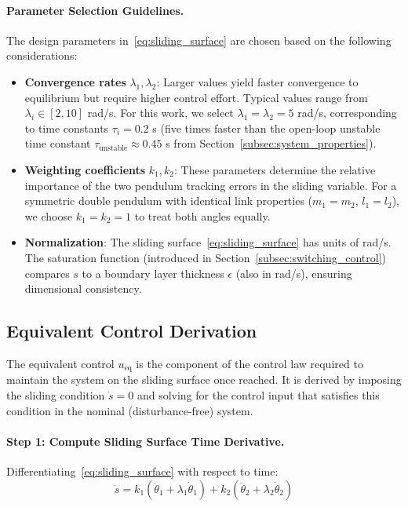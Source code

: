 \paragraph{Parameter Selection Guidelines.}
The design parameters in~\eqref{eq:sliding_surface} are chosen based on the following considerations:
\begin{itemize}
    \item \textbf{Convergence rates} $\lambda_1, \lambda_2$: Larger values yield faster convergence to equilibrium but require higher control effort. Typical values range from $\lambda_i \in [2, 10]$ rad/s. For this work, we select $\lambda_1 = \lambda_2 = 5$ rad/s, corresponding to time constants $\tau_i = 0.2$ s (five times faster than the open-loop unstable time constant $\tau_{\text{unstable}} \approx 0.45$ s from Section~\ref{subsec:system_properties}).

    \item \textbf{Weighting coefficients} $k_1, k_2$: These parameters determine the relative importance of the two pendulum tracking errors in the sliding variable. For a symmetric double pendulum with identical link properties ($m_1 = m_2$, $l_1 = l_2$), we choose $k_1 = k_2 = 1$ to treat both angles equally.

    \item \textbf{Normalization}: The sliding surface~\eqref{eq:sliding_surface} has units of rad/s. The saturation function (introduced in Section~\ref{subsec:switching_control}) compares $s$ to a boundary layer thickness $\epsilon$ (also in rad/s), ensuring dimensional consistency.
\end{itemize}

\subsection{Equivalent Control Derivation}
\label{subsec:equivalent_control}

The equivalent control $u_{\text{eq}}$ is the component of the control law required to maintain the system on the sliding surface once reached. It is derived by imposing the sliding condition $\dot{s} = 0$ and solving for the control input that satisfies this condition in the nominal (disturbance-free) system.

\paragraph{Step 1: Compute Sliding Surface Time Derivative.}
Differentiating~\eqref{eq:sliding_surface} with respect to time:
\begin{equation}
\label{eq:sliding_derivative}
\dot{s} = k_1(\ddot{\theta}_1 + \lambda_1\dot{\theta}_1) + k_2(\ddot{\theta}_2 + \lambda_2\dot{\theta}_2)
\end{equation}

